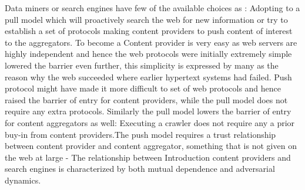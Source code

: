 \documentclass[article,type=msc,colorback,accentcolor=tud9c,twoside,11pt]{tudthesis}
\begin{document}
Data miners or search engines have few of the available choices as : Adopting to a pull model which will proactively search the web for new information or try to establish a set of protocols making content providers to push content of interest to the aggregators. To become a Content provider is very easy as web servers are highly independent and hence the web protocols were initially extremely simple lowered the barrier even further, this simplicity is expressed by many as the reason why the web succeeded where earlier hypertext systems had failed. Push protocol might have made it more difficult to set of web protocols and hence raised the barrier of entry for content providers, while the pull model does not require any extra protocols. Similarly the pull model lowers the barrier of entry for content aggregators as well: Executing a crawler does not require any a prior buy-in from content providers.The push model requires a trust relationship between content provider and content aggregator, something that is not given on the web at large - The relationship between Introduction content providers and search engines is characterized by both mutual dependence and adversarial dynamics.
\end{document}
